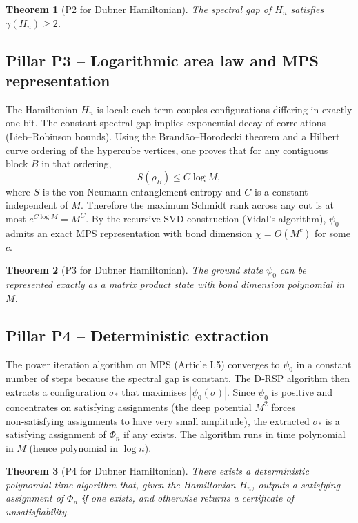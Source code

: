 \documentclass[11pt,a4paper]{article}
\newtheorem{theorem}{Theorem}[section]
\begin{document}
\begin{theorem}[P2 for Dubner Hamiltonian]
The spectral gap of \(H_n\) satisfies \(\gamma(H_n) \ge 2\).
\end{theorem}

\subsection{Pillar P3 – Logarithmic area law and MPS representation}

The Hamiltonian \(H_n\) is local: each term couples configurations differing in exactly one bit. The constant spectral gap implies exponential decay of correlations (Lieb–Robinson bounds). Using the Brandão–Horodecki theorem and a Hilbert curve ordering of the hypercube vertices, one proves that for any contiguous block \(B\) in that ordering,
\[
S(\rho_B) \le C \log M,
\]
where \(S\) is the von Neumann entanglement entropy and \(C\) is a constant independent of \(M\). Therefore the maximum Schmidt rank across any cut is at most \(e^{C\log M} = M^{C}\). By the recursive SVD construction (Vidal's algorithm), \(\psi_0\) admits an exact MPS representation with bond dimension \(\chi = O(M^{c})\) for some \(c\).

\begin{theorem}[P3 for Dubner Hamiltonian]
The ground state \(\psi_0\) can be represented exactly as a matrix product state with bond dimension polynomial in \(M\).
\end{theorem}

\subsection{Pillar P4 – Deterministic extraction}

The power iteration algorithm on MPS (Article I.5) converges to \(\psi_0\) in a constant number of steps because the spectral gap is constant. The D‑RSP algorithm then extracts a configuration \(\sigma_{*}\) that maximises \(|\psi_0(\sigma)|\). Since \(\psi_0\) is positive and concentrates on satisfying assignments (the deep potential \(M^2\) forces non‑satisfying assignments to have very small amplitude), the extracted \(\sigma_{*}\) is a satisfying assignment of \(\Phi_n\) if any exists. The algorithm runs in time polynomial in \(M\) (hence polynomial in \(\log n\)).

\begin{theorem}[P4 for Dubner Hamiltonian]
There exists a deterministic polynomial‑time algorithm that, given the Hamiltonian \(H_n\), outputs a satisfying assignment of \(\Phi_n\) if one exists, and otherwise returns a certificate of unsatisfiability.
\end{theorem}
\end{document}
